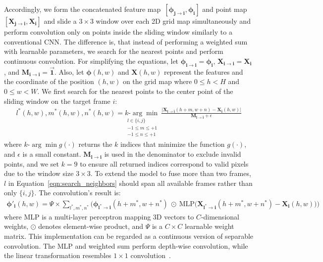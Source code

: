 Accordingly, we form the concatenated feature map~$[\boldsymbol{\phi_{j \rightarrow i}},\boldsymbol{\phi_{i}}]$ and point map~$[\boldsymbol{X_{j \rightarrow i}},\boldsymbol{X_{i}}]$ and slide a $3\times3$ window over each 2D grid map simultaneously and perform convolution only on points inside the sliding window similarly to a conventional CNN. The difference is, that instead of performing a weighted sum with learnable parameters, we search for the nearest points and perform continuous convolution. For simplifying the equations, let $\boldsymbol{\phi_{i \rightarrow i}}=\boldsymbol{\phi_{i}}$, $\boldsymbol{X_{i \rightarrow i}}=\boldsymbol{X_{i}}$, and $\boldsymbol{M_{i \rightarrow i}}=\vec{\mathbf{1}}$. Also, let $\boldsymbol{\phi}(h,w)$ and $\boldsymbol{X}(h,w)$ represent the features and the coordinate of the position $(h,w)$ on the grid map where $0 \le h < H$ and $0 \le w < W$. We first search for the nearest points to the center point of the sliding window on the target frame $i$:
\begin{align} \label{eqn:search_neighbors}
l^*(h,w),m^*(h,w),n^*(h,w) = \underset{\substack{l \in \{i,j\} \\ -1\le m \le +1 \\ -1 \le n \le +1}}{\textit{k-}\!\arg\min} \
\frac{\big| \boldsymbol{X_{l \rightarrow i}}(h+m,w+n) - \boldsymbol{X_{i}}(h,w)\big|}{\boldsymbol{M_{l \rightarrow i}} + \epsilon}
\end{align}
where $\textit{k-}\!\arg\min g(\cdot)$ returns the $k$ indices that minimize the function $g(\cdot)$, and $\epsilon$ is a small constant. $\boldsymbol{M_{l \rightarrow i}}$ is used in the denominator to exclude invalid points, and we set $k=9$ to ensure all returned indices correspond to valid pixels due to the window size $3 \times 3$. To extend the model to fuse more than two frames, $l$ in Equation~\eqref{eqn:search_neighbors} should span all available frames rather than only $\{i,j\}$. The convolution's result is:
\begin{align}
\boldsymbol{\phi'_{i}}(h,w)= \Psi \times \! \! \! \! \sum_{l^*,m^*,n^*} \! \! \!
\Big( \! \boldsymbol{\phi_{l^* \rightarrow i}}(h+m^*,w+n^*) \ \odot \ \text{MLP}\big(\boldsymbol{X_{l^* \rightarrow i}}(h+m^*,w+n^*) - \boldsymbol{X_{i}}(h,w)\big) \Big)
\end{align}
where MLP is a multi-layer perceptron mapping 3D vectors to $C$-dimensional weights, $\odot$ denotes element-wise product, and $\Psi$ is a $C \times C$ learnable weight matrix. This implementation can be regarded as a continuous version of separable convolution. The MLP and weighted sum perform depth-wise convolution, while the linear transformation resembles $1 \times 1$ convolution~\citep{chen2019learning}.

